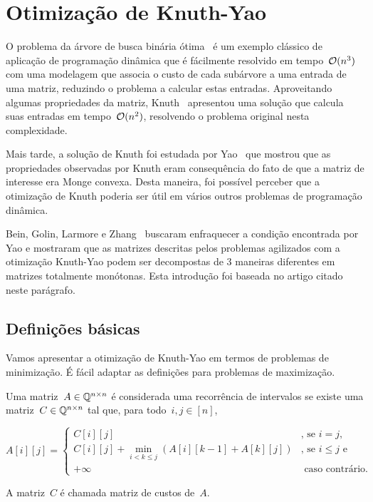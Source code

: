 \section{Otimização de Knuth-Yao}
\label{KY}


O problema da árvore de busca binária ótima~\cite{CLRS} é um exemplo clássico de aplicação de programação dinâmica que é fácilmente resolvido em tempo~$\mathcal{O}(n^3)$ com uma modelagem que associa o custo de cada subárvore a uma entrada de uma matriz, reduzindo o problema a calcular estas entradas. Aproveitando algumas propriedades da matriz, Knuth~\cite{Knuth:1971} apresentou uma solução que calcula suas entradas em tempo~$\mathcal{O}(n^2)$, resolvendo o problema original nesta complexidade.

Mais tarde, a solução de Knuth foi estudada por Yao~\cite{Yao:1980,Yao:1982} que mostrou que as propriedades observadas por Knuth eram consequência do fato de que a matriz de interesse era Monge convexa. Desta maneira, foi possível perceber que a otimização de Knuth poderia ser útil em vários outros problemas de programação dinâmica. 

Bein, Golin, Larmore e Zhang~\cite{Bein:2009} buscaram enfraquecer a condição encontrada por Yao e mostraram que as matrizes descritas pelos problemas agilizados com a otimização Knuth-Yao podem ser decompostas de 3 maneiras diferentes em matrizes totalmente monótonas. Esta introdução foi baseada no artigo citado neste parágrafo.


\subsection{Definições básicas} \label{KY:defs}

Vamos apresentar a otimização de Knuth-Yao em termos de problemas de minimização. É fácil adaptar as definições para problemas de maximização.

\begin{defi}
Uma matriz~$A \in \mathbb{Q}^{n \times n}$ é considerada uma recorrência de intervalos se existe uma matriz~$C \in \mathbb{Q}^{n \times n}$ tal que, para todo~$i,j \in [n]$,

\begin{equation*}
A[i][j] = \begin{cases}
C[i][j]                                                           & \text{, se } i = j \text{, }  \\
C[i][j] + \min\limits_{i < k \leq j}(A[i][k-1] + A[k][j])         & \text{, se } i \leq j \text{ e } \\
+\infty                                                           & \text{ caso contrário. }
\end{cases}
\end{equation*}

A matriz~$C$ é chamada matriz de custos de~$A$.
\end{defi}

